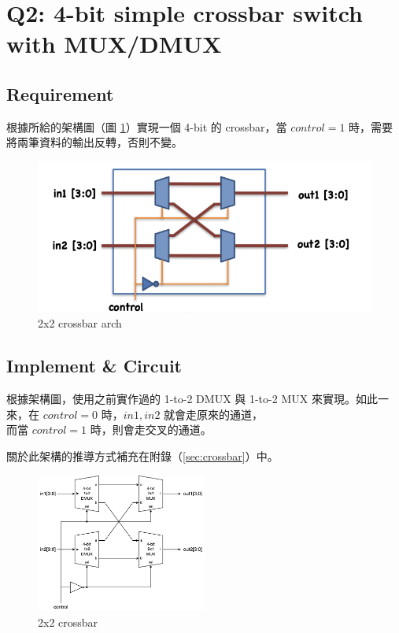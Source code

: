 \documentclass[10.5pt,compsoc,UTF8]{CjC}
\theoremstyle{mystyle}
\begin{document}
\section{Q2: 4-bit simple crossbar switch with MUX/DMUX}

\subsection{Requirement}

根據所給的架構圖（圖 \ref{fig:2x2_spec}）實現一個 4-bit 的 crossbar，當 $control = 1$ 時，需要將兩筆資料的輸出反轉，否則不變。

\begin{figure}
    \centering
    \includegraphics[width=\textwidth]{2x2_spec.png}
      \caption{2x2 crossbar arch}
    \label{fig:2x2_spec}
\end{figure}

\subsection{Implement \& Circuit}

根據架構圖，使用之前實作過的 1-to-2 DMUX 與 1-to-2 MUX 來實現。如此一來，在 $control = 0$ 時，$in1, in2$ 就會走原來的通道，\\
而當 $control = 1$ 時，則會走交叉的通道。
\par
關於此架構的推導方式補充在附錄（\ref{sec:crossbar}）中。

\begin{figure}[h]
    \centering
    \includegraphics[width=0.5\textwidth]{2x2 crossbar.png}
      \caption{2x2 crossbar}
    \label{fig:2x2_crossbar}
\end{figure}
\end{document}

